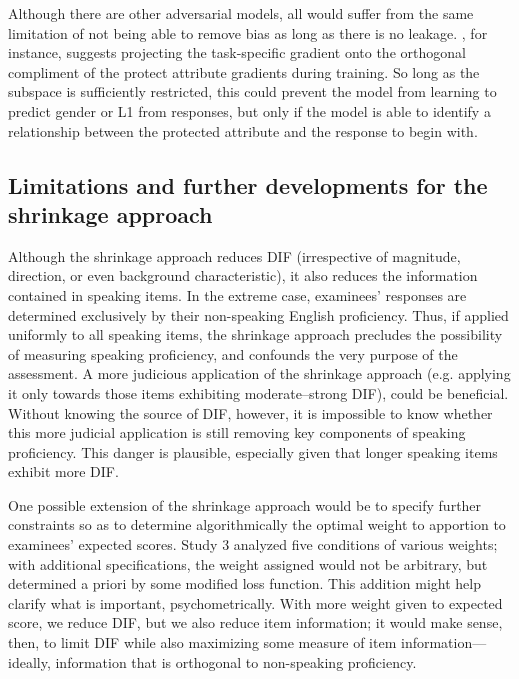 \documentclass [PhD] {uclathes}
\begin{document}
Although there are other adversarial models, all would suffer from the same limitation of not being able to remove bias as long as there is no leakage. \citet{zhang2018mitigating}, for instance, suggests projecting the task-specific gradient onto the orthogonal compliment of the protect attribute gradients during training. So long as the subspace is sufficiently restricted, this could prevent the model from learning to predict gender or L1 from responses, but only if the model is able to identify a relationship between the protected attribute and the response to begin with. 

\subsection{Limitations and further developments for the shrinkage approach}

Although the shrinkage approach reduces DIF (irrespective of magnitude, direction, or even background characteristic), it also reduces the information contained in speaking items. In the extreme case, examinees’ responses are determined exclusively by their non-speaking English proficiency. Thus, if applied uniformly to all speaking items, the shrinkage approach precludes the possibility of measuring speaking proficiency, and confounds the very purpose of the assessment. A more judicious application of the shrinkage approach (e.g. applying it only towards those items exhibiting moderate–strong DIF), could be beneficial. Without knowing the source of DIF, however, it is impossible to know whether this more judicial application is still removing key components of speaking proficiency. This danger is plausible, especially given that longer speaking items exhibit more DIF. 

One possible extension of the shrinkage approach would be to specify further constraints so as to determine algorithmically the optimal weight to apportion to examinees’ expected scores. Study 3 analyzed five conditions of various weights; with additional specifications, the weight assigned would not be arbitrary, but determined a priori by some modified loss function. This addition might help clarify what is important, psychometrically. With more weight given to expected score, we reduce DIF, but we also reduce item information; it would make sense, then, to limit DIF while also maximizing some measure of item information—ideally, information that is orthogonal to non-speaking proficiency. 
\end{document}
